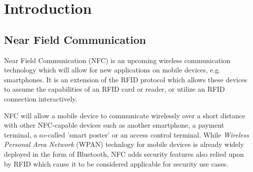 \section{Introduction}


\subsection{Near Field Communication} %
Near Field Communication (NFC) is an upcoming wireless communication technology which will allow for new applications on mobile devices, e.g. smartphones.
It is an extension of the RFID protocol which allows these devices to assume the capabilities of an RFID card or reader, or utilize an RFID connection interactively.
 
NFC will allow a mobile device to communicate wirelessly over a short distance with other NFC-capable devices such as another smartphone, a payment terminal, a so-called 'smart poster' or an access control terminal.
While \textit{Wireless Personal Area Network} (WPAN) technlogy for mobile devices is already widely deployed in the form of Bluetooth, NFC adds security features also relied upon by RFID which cause it to be considered applicable for security use cases.




